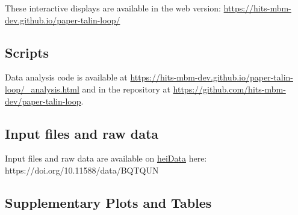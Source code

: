 \documentclass[
  twocolumn]{biophys-new-mod}
\begin{document}
These interactive displays are available in the web version:
\url{https://hits-mbm-dev.github.io/paper-talin-loop/}

\hypertarget{scripts}{%
\subsection{Scripts}\label{scripts}}

Data analysis code is available at
\url{https://hits-mbm-dev.github.io/paper-talin-loop/_analysis.html} and
in the repository at
\url{https://github.com/hits-mbm-dev/paper-talin-loop}.

\hypertarget{sec-data}{%
\subsection{Input files and raw data}\label{sec-data}}

Input files and raw data are available on
\href{https://heidata.uni-heidelberg.de/}{heiData} here:
https://doi.org/10.11588/data/BQTQUN

\onecolumn

\hypertarget{supplementary-plots-and-tables}{%
\subsection{Supplementary Plots and
Tables}\label{supplementary-plots-and-tables}}
\end{document}
